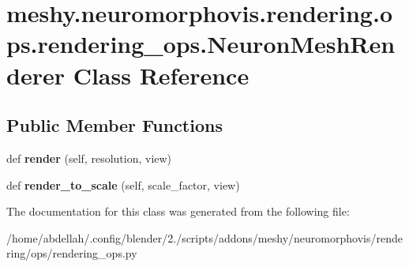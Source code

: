 \hypertarget{classmeshy_1_1neuromorphovis_1_1rendering_1_1ops_1_1rendering__ops_1_1NeuronMeshRenderer}{}\section{meshy.\+neuromorphovis.\+rendering.\+ops.\+rendering\+\_\+ops.\+Neuron\+Mesh\+Renderer Class Reference}
\label{classmeshy_1_1neuromorphovis_1_1rendering_1_1ops_1_1rendering__ops_1_1NeuronMeshRenderer}
\subsection*{Public Member Functions}
\begin{DoxyCompactItemize}
\item 
def {\bfseries render} (self, resolution, view)\hypertarget{classmeshy_1_1neuromorphovis_1_1rendering_1_1ops_1_1rendering__ops_1_1NeuronMeshRenderer_a40af8da79038e88a8c4e8db054d074fc}{}\label{classmeshy_1_1neuromorphovis_1_1rendering_1_1ops_1_1rendering__ops_1_1NeuronMeshRenderer_a40af8da79038e88a8c4e8db054d074fc}

\item 
def {\bfseries render\+\_\+to\+\_\+scale} (self, scale\+\_\+factor, view)\hypertarget{classmeshy_1_1neuromorphovis_1_1rendering_1_1ops_1_1rendering__ops_1_1NeuronMeshRenderer_a3f3b02261c6c5452846967f5fdfbec19}{}\label{classmeshy_1_1neuromorphovis_1_1rendering_1_1ops_1_1rendering__ops_1_1NeuronMeshRenderer_a3f3b02261c6c5452846967f5fdfbec19}

\end{DoxyCompactItemize}


The documentation for this class was generated from the following file\+:\begin{DoxyCompactItemize}
\item 
/home/abdellah/.\+config/blender/2./scripts/addons/meshy/neuromorphovis/rendering/ops/rendering\+\_\+ops.\+py\end{DoxyCompactItemize}
